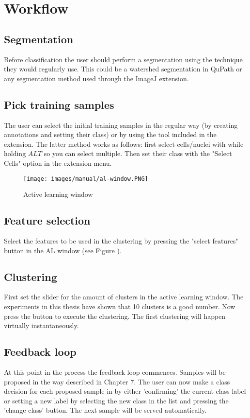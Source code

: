 \section{Workflow}

\subsection{Segmentation}
Before classification the user should perform a segmentation using the technique they would regularly use. This could be a watershed segmentation in QuPath or any segmentation method used through the ImageJ extension.

\subsection{Pick training samples}
The user can select the initial training samples in the regular way (by creating annotations and setting their class) or by using the tool included in the extension. The latter method works as follows: first select cells/nuclei with while holding $ALT$ so you can select multiple. Then set their class with the "Select Cells" option in the extension menu.

\begin{figure}
    \centering
    \texttt{[image: images/manual/al-window.PNG]}
    \caption{Active learning window}
    \label{fig:al-window}
\end{figure}

\subsection{Feature selection}
Select the features to be used in the clustering by pressing the "select features" button in the AL window (see Figure \cite{fig:al-window}).

\subsection{Clustering}
First set the slider for the amount of clusters in the active learning window. The experiments in this thesis have shown that 10 clusters is a good number. Now press the button to execute the clustering. The first clustering will happen virtually instantaneously.

\subsection{Feedback loop}
At this point in the process the feedback loop commences. Samples will be proposed in the way described in Chapter 7. The user can now make a class decision for each proposed sample in by either 'confirming' the current class label or setting a new label by selecting the new class in the list and pressing the 'change class' button. The next sample will be served automatically.

